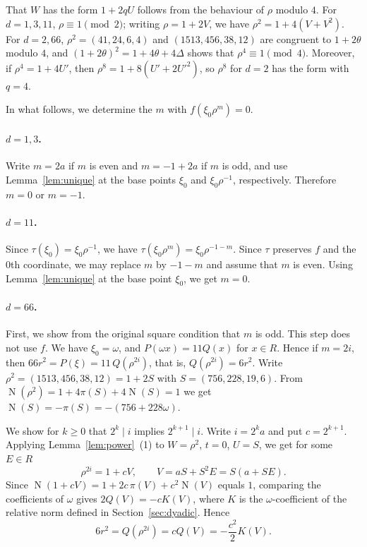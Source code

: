 \documentclass[a4paper,11pt]{article}
\theoremstyle{plain}
\theoremstyle{definition}
\theoremstyle{remark}
\numberwithin{equation}{section}
\numberwithin{table}{section}
\newcommand{\Nm}{\operatorname{N}}
\begin{document}
That $W$ has the form $1+2qU$ follows from the behaviour of $\rho$ modulo $4$.
For $d=1,3,11$, $\rho\equiv1\pmod2$; writing $\rho=1+2V$, we have $\rho^2=1+4(V+V^2)$.
For $d=2,66$, $\rho^2=(41,24,6,4)$ and $(1513,456,38,12)$ are congruent to $1+2\theta$ modulo $4$, and $(1+2\theta)^2=1+4\theta+4\Delta$ shows that $\rho^4\equiv1\pmod4$.
Moreover, if $\rho^4=1+4U'$, then $\rho^8=1+8(U'+2U'^2)$, so $\rho^8$ for $d=2$ has the form with $q=4$.

In what follows, we determine the $m$ with $f(\xi_0\rho^m)=0$.

\paragraph{$d=1,3$.}
Write $m=2a$ if $m$ is even and $m=-1+2a$ if $m$ is odd, and use Lemma~\ref{lem:unique} at the base points $\xi_0$ and $\xi_0\rho^{-1}$, respectively.
Therefore $m=0$ or $m=-1$.

\paragraph{$d=11$.}
Since $\tau(\xi_0)=\xi_0\rho^{-1}$, we have $\tau(\xi_0\rho^m)=\xi_0\rho^{-1-m}$.
Since $\tau$ preserves $f$ and the $0$th coordinate, we may replace $m$ by $-1-m$ and assume that $m$ is even.
Using Lemma~\ref{lem:unique} at the base point $\xi_0$, we get $m=0$.

\paragraph{$d=66$.}
First, we show from the original square condition that $m$ is odd. This step does not use $f$.
We have $\xi_0=\omega$, and $P(\omega x)=11Q(x)$ for $x\in R$. Hence if $m=2i$, then $66r^2=P(\xi)=11\,Q(\rho^{2i})$, that is, $Q(\rho^{2i})=6r^2$.
Write $\rho^2=(1513,456,38,12)=1+2S$ with $S=(756,228,19,6)$. From $\Nm(\rho^2)=1+4\pi(S)+4\Nm(S)=1$ we get $\Nm(S)=-\pi(S)=-(756+228\omega)$.

We show for $k\ge0$ that $2^k\mid i$ implies $2^{k+1}\mid i$. Write $i=2^ka$ and put $c=2^{k+1}$.
Applying Lemma~\ref{lem:power}~(1) to $W=\rho^2$, $t=0$, $U=S$, we get for some $E\in R$
\[
\rho^{2i}=1+cV,\qquad V=aS+S^2E=S(a+SE).
\]
Since $\Nm(1+cV)=1+2c\,\pi(V)+c^2\Nm(V)$ equals $1$, comparing the coefficients of $\omega$ gives $2Q(V)=-cK(V)$, where $K$ is the $\omega$-coefficient of the relative norm defined in Section~\ref{sec:dyadic}. Hence
\[
6r^2=Q(\rho^{2i})=cQ(V)=-\frac{c^2}2K(V).
\]
\end{document}
